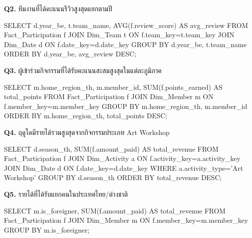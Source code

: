 \documentclass[11pt]{article}
\begin{document}
\textbf{Q2.} ทีมงานที่ได้คะแนนรีวิวสูงสุดแยกตามปี
\begin{sql}
SELECT d.year_be, t.team_name, AVG(f.review_score) AS avg_review
FROM Fact_Participation f
JOIN Dim_Team t ON f.team_key=t.team_key
JOIN Dim_Date d ON f.date_key=d.date_key
GROUP BY d.year_be, t.team_name
ORDER BY d.year_be, avg_review DESC;
\end{sql}

\textbf{Q3.} ผู้เข้าร่วมกิจกรรมที่ได้รับคะแนนสะสมสูงสุดในแต่ละภูมิภาค
\begin{sql}
SELECT m.home_region_th, m.member_id, SUM(f.points_earned) AS total_points
FROM Fact_Participation f
JOIN Dim_Member m ON f.member_key=m.member_key
GROUP BY m.home_region_th, m.member_id
ORDER BY m.home_region_th, total_points DESC;
\end{sql}

\textbf{Q4.} ฤดูใดมีรายได้รวมสูงสุดจากกิจกรรมประเภท Art Workshop
\begin{sql}
SELECT d.season_th, SUM(f.amount_paid) AS total_revenue
FROM Fact_Participation f
JOIN Dim_Activity a ON f.activity_key=a.activity_key
JOIN Dim_Date d ON f.date_key=d.date_key
WHERE a.activity_type='Art Workshop'
GROUP BY d.season_th ORDER BY total_revenue DESC;
\end{sql}

\textbf{Q5.} รายได้ที่ได้รับแยกคนในประเทศไทย/ต่างชาติ
\begin{sql}
SELECT m.is_foreigner, SUM(f.amount_paid) AS total_revenue
FROM Fact_Participation f
JOIN Dim_Member m ON f.member_key=m.member_key
GROUP BY m.is_foreigner;
\end{sql}
\end{document}

